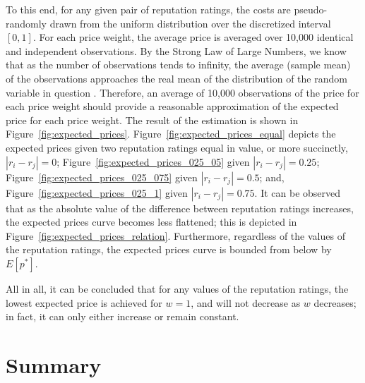 To this end, for any given pair of reputation ratings, the costs are pseudo-randomly drawn from the uniform distribution over the discretized interval $[0,1]$. For each price weight, the average price is averaged over 10,000 identical and independent observations. By the Strong Law of Large Numbers, we know that as the number of observations tends to infinity, the average (sample mean) of the observations approaches the real mean of the distribution of the random variable in question \cite{LawChapter42007}. Therefore, an average of 10,000 observations of the price for each price weight should provide a reasonable approximation of the expected price for each price weight. The result of the estimation is shown in Figure~\ref{fig:expected_prices}. Figure~\ref{fig:expected_prices_equal} depicts the expected prices given two reputation ratings equal in value, or more succinctly, $|r_i-r_j|=0$; Figure~\ref{fig:expected_prices_025_05} given $|r_i-r_j|=0.25$; Figure~\ref{fig:expected_prices_025_075} given $|r_i-r_j|=0.5$; and, Figure~\ref{fig:expected_prices_025_1} given $|r_i-r_j|=0.75$. It can be observed that as the absolute value of the difference between reputation ratings increases, the expected prices curve becomes less flattened; this is depicted in Figure~\ref{fig:expected_prices_relation}. Furthermore, regardless of the values of the reputation ratings, the expected prices curve is bounded from below by $E[p^*]$.

All in all, it can be concluded that for any values of the reputation ratings, the lowest expected price is achieved for $w=1$, and will not decrease as $w$ decreases; in fact, it can only either increase or remain constant.

\section{Summary} %
\label{sec:summary_ch2}


